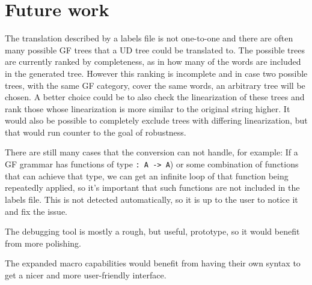

\section{Future work}

% 

The translation described by a labels file is not one-to-one and there are often many possible GF trees that a UD tree could be translated to. The possible trees are currently ranked by completeness, as in how many of the words are included in the generated tree. However this ranking is incomplete and in case two possible trees, with the same GF category, cover the same words, an arbitrary tree will be chosen. A better choice could be to also check the linearization of these trees and rank those whose linearization is more similar to the original string higher. It would also be possible to completely exclude trees with differing linearization, but that would run counter to the goal of robustness.

There are still many cases that the conversion can not handle, for example: If a GF grammar has functions of type \lstinline{: A -> A}) or some combination of functions that can achieve that type, we can get an infinite loop of that function being repeatedly applied, so it's important that such functions are not included in the labels file. This is not detected automatically, so it is up to the user to notice it and fix the issue.

The debugging tool is mostly a rough, but useful, prototype, so it would benefit from more polishing.

The expanded macro capabilities would benefit from having their own syntax to get a nicer and more user-friendly interface.

